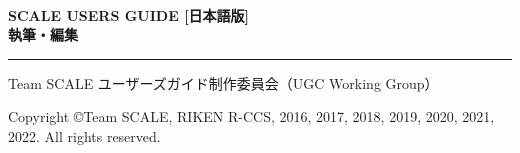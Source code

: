 \newpage
\thispagestyle{empty}

　\\

\vspace{10mm}
{\large{\bf SCALE USERS GUIDE [日本語版]}}\\


\vspace{10mm}
{\large{\bf 執筆・編集}}\\
\hrule width 90mm
\begin{tabbing}
Team SCALE ユーザーズガイド制作委員会（UGC Working Group）%
\end{tabbing}


\vspace{110mm}
\begin{flushright}

\vspace{10mm}
Copyright \copyright Team SCALE, RIKEN R-CCS, 2016, 2017, 2018, 2019, 2020, 2021, 2022. All rights reserved.
\end{flushright}

